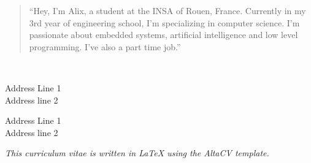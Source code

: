 \documentclass[10pt,a4paper,ragged2e,withhyper]{./AltaCV/altacv}
\begin{document}
\begin{paracol}{2}

  \begin{quote}
    ``Hey, I’m Alix, a student at the INSA of Rouen, France. Currently in my 3rd year of engineering school, I’m specializing in computer science.
    I’m passionate about embedded systems, artificial intelligence and low level programming.
    I’ve also a part time job.''
  \end{quote}



  \divider


  \divider



  \\

  \divider\smallskip

  \cvtag{\LaTeX}


  \divider

  \divider


  \medskip
  

  {Address Line 1\\Address line 2}

  \divider

  {Address Line 1\\Address line 2}


\end{paracol}

\textit{This curriculum vitae is written in \LaTeX{} using the AltaCV template.}
\end{document}
